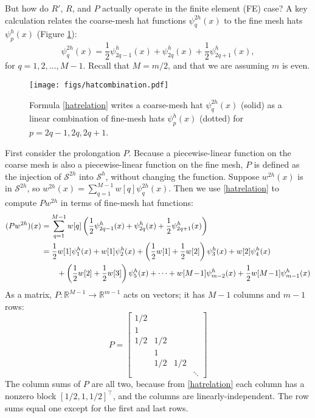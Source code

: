 \documentclass[letterpaper,final,12pt,reqno]{amsart}
\newcommand{\RR}{\mathbb{R}}
\begin{document}
But how do $R'$, $R$, and $P$ actually operate in the finite element (FE) case?  A key calculation relates the coarse-mesh hat functions $\psi_q^{2h}(x)$ to the fine mesh hats $\psi_p^h(x)$ (Figure \ref{fig:hatcombination}):
\begin{equation}
  \psi_q^{2h}(x) = \frac{1}{2} \psi_{2q-1}^h(x) + \psi_{2q}^h(x) + \frac{1}{2} \psi_{2q+1}^h(x), \label{hatrelation}
\end{equation}
for $q=1,2,\dots,M-1$.  Recall that $M=m/2$, and that we are assuming $m$ is even.

\begin{figure}
\texttt{[image: figs/hatcombination.pdf]}
\caption{Formula \eqref{hatrelation} writes a coarse-mesh hat $\psi_q^{2h}(x)$ (solid) as a linear combination of fine-mesh hats $\psi_p^h(x)$ (dotted) for $p=2q-1,2q,2q+1$.}
\label{fig:hatcombination}
\end{figure}

First consider the prolongation $P$.  Because a piecewise-linear function on the coarse mesh is also a piecewise-linear function on the fine mesh, $P$ is defined as the injection of $\mathcal{S}^{2h}$ into $\mathcal{S}^h$, without changing the function.  Suppose $w^{2h}(x)$ is in $\mathcal{S}^{2h}$, so $w^{2h}(x) = \sum_{q=1}^{M-1} w[q] \psi_q^{2h}(x)$.  Then we use \eqref{hatrelation} to compute $P w^{2h}$ in terms of fine-mesh hat functions:
\begin{align}
(P w^{2h})(x) &= \sum_{q=1}^{M-1} w[q] \left(\frac{1}{2} \psi_{2q-1}^h(x) + \psi_{2q}^h(x) + \frac{1}{2} \psi_{2q+1}^h(x)\right) \label{pformula} \\
              &= \frac{1}{2} w[1] \psi_1^h(x) + w[1] \psi_2^h(x) + \left(\frac{1}{2} w[1] + \frac{1}{2} w[2]\right) \psi_3^h(x) + w[2] \psi_4^h(x) \notag \\
              &\qquad + \left(\frac{1}{2} w[2] + \frac{1}{2} w[3]\right) \psi_5^h(x) + \dots + w[M\!-\!1] \psi_{m-2}^h(x) + \frac{1}{2} w[M\!-\!1] \psi_{m-1}^h(x) \notag
\end{align}
As a matrix, $P:\RR^{M-1} \to \RR^{m-1}$ acts on vectors; it has $M-1$ columns and $m-1$ rows:
\begin{equation}
P = \begin{bmatrix}
1/2 & & & \\
1 & & & \\
1/2 & 1/2 & & \\
 & 1 & & \\
 & 1/2 & 1/2 & \\
 & & & \ddots
\end{bmatrix} \label{pmatrix}
\end{equation}
The column sums of $P$ are all two, because from \eqref{hatrelation} each column has a nonzero block $[1/2,1,1/2]^\top$, and the columns are linearly-independent.  The row sums equal one except for the first and last rows.
\end{document}
